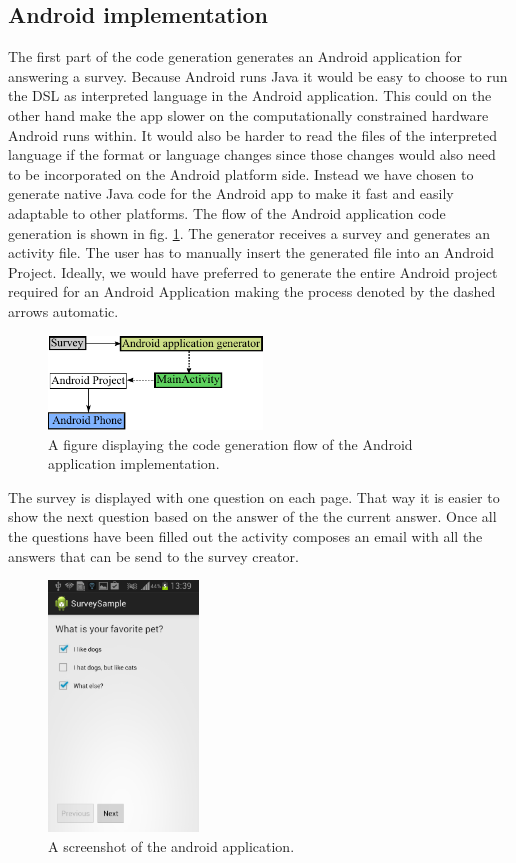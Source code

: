 \documentclass[runningheads]{llncs}
\begin{document}
\subsection{Android implementation}
The first part of the code generation generates an Android application for answering a survey. Because Android runs Java it would be easy to choose to run the DSL as interpreted language in the Android application. This could on the other hand make the app slower on the computationally constrained hardware Android runs within. It would also be harder to read the files of the interpreted language if the format or language changes since those changes would also need to be incorporated on the Android platform side. Instead we have chosen to generate native Java code for the Android app to make it fast and easily adaptable to other platforms. The flow of the Android application code generation is shown in fig. \ref{fig:appgen}. The generator receives a survey and generates an activity file. The user has to manually insert the generated file into an Android Project. Ideally, we would have preferred to generate the entire Android project required for an Android Application making the process denoted by the dashed arrows automatic. 
\begin{figure}
\centering
\includegraphics[height=2.5cm]{appgen}
\caption{A figure displaying the code generation flow of the Android application implementation.}
\label{fig:appgen}
\end{figure}
The survey is displayed with one question on each page. That way it is easier to show the next question based on the answer of the the current answer. Once all the questions have been filled out the activity composes an email with all the answers that can be send to the survey creator.

\begin{figure}[h]
\centering
\includegraphics[width=4cm]{android_screenshot}
\caption{A screenshot of the android application.}
\label{fig:android_screenshot}
\end{figure}
\end{document}
